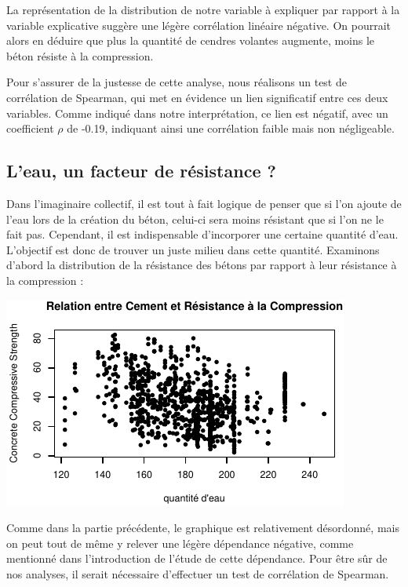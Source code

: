 \documentclass[
  12pt,
]{article}
\begin{document}
La représentation de la distribution de notre variable à expliquer par
rapport à la variable explicative suggère une légère corrélation
linéaire négative. On pourrait alors en déduire que plus la quantité de
cendres volantes augmente, moins le béton résiste à la compression.

Pour s'assurer de la justesse de cette analyse, nous réalisons un test
de corrélation de Spearman, qui met en évidence un lien significatif
entre ces deux variables. Comme indiqué dans notre interprétation, ce
lien est négatif, avec un coefficient \(\rho\) de -0.19, indiquant ainsi
une corrélation faible mais non négligeable.

\subsection{L'eau, un facteur de résistance
?}\label{leau-un-facteur-de-ruxe9sistance}

Dans l'imaginaire collectif, il est tout à fait logique de penser que si
l'on ajoute de l'eau lors de la création du béton, celui-ci sera moins
résistant que si l'on ne le fait pas. Cependant, il est indispensable
d'incorporer une certaine quantité d'eau. L'objectif est donc de trouver
un juste milieu dans cette quantité. Examinons d'abord la distribution
de la résistance des bétons par rapport à leur résistance à la
compression :

\begin{center}\includegraphics{rmd_final_files/figure-latex/unnamed-chunk-17-1} \end{center}

Comme dans la partie précédente, le graphique est relativement
désordonné, mais on peut tout de même y relever une légère dépendance
négative, comme mentionné dans l'introduction de l'étude de cette
dépendance. Pour être sûr de nos analyses, il serait nécessaire
d'effectuer un test de corrélation de Spearman.
\end{document}
